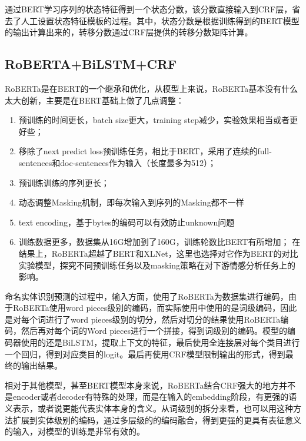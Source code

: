 \documentclass[a4paper, 12pt]{article}
\begin{document}
通过BERT学习序列的状态特征得到一个状态分数，该分数直接输入到CRF层，省去了人工设置状态特征模板的过程。其中，状态分数是根据训练得到的BERT模型的输出计算出来的，转移分数通过CRF层提供的转移分数矩阵计算。



\subsection{RoBERTA+BiLSTM+CRF} %
\label{sub:roberta}
RoBERTa是在BERT的一个继承和优化，从模型上来说，RoBERTa基本没有什么太大创新，主要是在BERT基础上做了几点调整：

\begin{enumerate}
    \item 预训练的时间更长，batch size更大，training step减少，实验效果相当或者更好些；
    \item 移除了next predict loss预训练任务，相比于BERT，采用了连续的full-sentences和doc-sentences作为输入（长度最多为512）；
    \item 预训练训练的序列更长；
    \item 动态调整Masking机制，即每次输入到序列的Masking都不一样
    \item text encoding，基于bytes的编码可以有效防止unknown问题
    \item 训练数据更多，数据集从16G增加到了160G，训练轮数比BERT有所增加；
    在结果上，RoBERTa超越了BERT和XLNet，这里也选择对它作为BERT的对比实验模型，探究不同预训练任务以及masking策略在对下游情感分析任务上的影响。
\end{enumerate}

命名实体识别预测的过程中，输入方面，使用了RoBERTa为数据集进行编码，由于RoBERTa使用word pieces级别的编码，而实际使用中使用的是词级编码，因此是对每个词进行了word pieces级别的切分，然后对切分的结果使用RoBERTa编码，然后再对每个词的Word pieces进行一个拼接，得到词级别的编码。模型的编码器使用的还是BiLSTM，提取上下文的特征，最后使用全连接层对每个类目进行一个回归，得到对应类目的logit。最后再使用CRF模型限制输出的形式，得到最终的输出结果。

相对于其他模型，甚至BERT模型本身来说，RoBERTa结合CRF强大的地方并不是encoder或者decoder有特殊的处理，而是在输入的embedding阶段，有更强的语义表示，或者说更能代表实体本身的含义。从词级别的拆分来看，也可以用这种方法扩展到实体级别的编码，通过多层级的的编码融合，得到更强的更具有表征意义的输入，对模型的训练是非常有效的。


\end{document}
